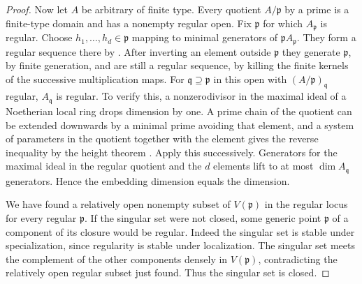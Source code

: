 \begin{proof}
Now let \(A\) be arbitrary of finite type. Every quotient \(A/\mathfrak p\) by a prime is a finite-type domain and has a nonempty regular open. Fix \(\mathfrak p\) for which \(A_{\mathfrak p}\) is regular. Choose \(h_1,\ldots,h_d\in\mathfrak p\) mapping to minimal generators of \(\mathfrak p A_{\mathfrak p}\). They form a regular sequence there by \cite[CM-08]{core}. After inverting an element outside \(\mathfrak p\) they generate \(\mathfrak p\), by finite generation, and are still a regular sequence, by killing the finite kernels of the successive multiplication maps. For \(\mathfrak q\supseteq\mathfrak p\) in this open with \((A/\mathfrak p)_{\mathfrak q}\) regular, \(A_{\mathfrak q}\) is regular. To verify this, a nonzerodivisor in the maximal ideal of a Noetherian local ring drops dimension by one. A prime chain of the quotient can be extended downwards by a minimal prime avoiding that element, and a system of parameters in the quotient together with the element gives the reverse inequality by the height theorem \cite[ALG-05-C03-R01/S01]{p103}. Apply this successively. Generators for the maximal ideal in the regular quotient and the \(d\) elements lift to at most \(\dim A_{\mathfrak q}\) generators. Hence the embedding dimension equals the dimension.

We have found a relatively open nonempty subset of \(V(\mathfrak p)\) in the regular locus for every regular \(\mathfrak p\). If the singular set were not closed, some generic point \(\mathfrak p\) of a component of its closure would be regular. Indeed the singular set is stable under specialization, since regularity is stable under localization. The singular set meets the complement of the other components densely in \(V(\mathfrak p)\), contradicting the relatively open regular subset just found. Thus the singular set is closed.
\end{proof}

